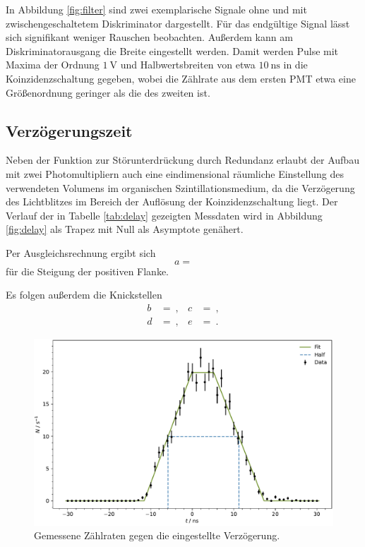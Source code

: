 In Abbildung \eqref{fig:filter} sind zwei exemplarische Signale ohne und mit zwischengeschaltetem Diskriminator dargestellt. Für
das endgültige Signal lässt sich signifikant weniger Rauschen beobachten. Außerdem kann am Diskriminatorausgang die Breite eingestellt
werden. Damit werden Pulse mit Maxima der Ordnung $\qty{1}{\volt}$ und Halbwertsbreiten von etwa $\qty{10}{\nano\second}$ in die
Koinzidenzschaltung gegeben, wobei die Zählrate aus dem ersten PMT etwa eine Größenordnung geringer als die des zweiten ist.



\subsection{Verzögerungszeit}

Neben der Funktion zur Störunterdrückung durch Redundanz erlaubt der Aufbau mit zwei Photomultipliern auch eine eindimensional
räumliche Einstellung des verwendeten Volumens im organischen Szintillationsmedium, da die Verzögerung des Lichtblitzes im Bereich
der Auflösung der Koinzidenzschaltung liegt. Der Verlauf der in Tabelle \eqref{tab:delay} gezeigten Messdaten wird in Abbildung
\eqref{fig:delay} als Trapez mit Null als Asymptote genähert.

Per Ausgleichsrechnung ergibt sich
\begin{equation*}
	a = 
\end{equation*}
für die Steigung der positiven Flanke.

Es folgen außerdem die Knickstellen
\begin{align*}
	b &=  \: , & c &=  \: , \\
	d &=  \: , & e &=  \: .
\end{align*}

\begin{figure}[H]
	\centering
	\includegraphics[width=\textwidth]{build/delay.pdf}
	\caption{Gemessene Zählraten gegen die eingestellte Verzögerung.}
	\label{fig:delay}
\end{figure}

